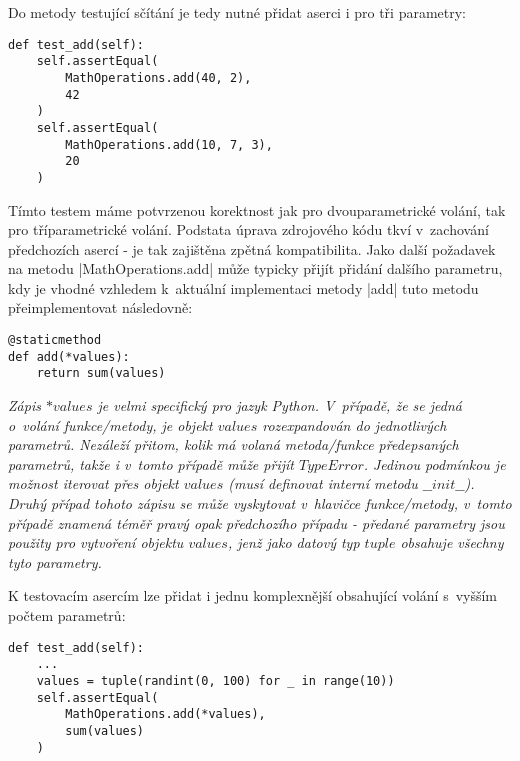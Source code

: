 Do metody testující sčítání je tedy nutné přidat aserci i pro tři parametry:

\begin{lstlisting}[caption={Testovací metoda pro vylepšenou $MathOperations.add$}]
def test_add(self):
	self.assertEqual(
		MathOperations.add(40, 2),
		42
	)
	self.assertEqual(
		MathOperations.add(10, 7, 3),
		20
	)
\end{lstlisting}

\begin{sloppypar}
	Tímto testem máme potvrzenou korektnost jak pro dvouparametrické volání, tak pro  tříparametrické volání. Podstata úprava zdrojového kódu tkví v~zachování předchozích asercí - je tak zajištěna zpětná kompatibilita. Jako další požadavek na metodu \ic|MathOperations.add| může typicky přijít přidání dalšího parametru, kdy je vhodné vzhledem k~aktuální implementaci metody \ic|add| tuto metodu přeimplementovat následovně:
\end{sloppypar}

\begin{lstlisting}[caption={Finální implementace metody $MathOperations.add$}]
@staticmethod
def add(*values):
	return sum(values)
\end{lstlisting}

\textit{
  Zápis $*values$ je velmi specifický pro jazyk Python. V~případě, že se jedná o~volání funkce/metody, je objekt $values$ rozexpandován do jednotlivých parametrů. Nezáleží přitom, kolik má volaná metoda/funkce předepsaných parametrů, takže i v~tomto případě může přijít $TypeError$. Jedinou podmínkou je možnost iterovat přes objekt $values$ (musí definovat interní metodu $\_\_init\_\_$). \\Druhý případ tohoto zápisu se může vyskytovat v~hlavičce funkce/metody, v~tomto případě znamená téměř pravý opak předchozího případu - předané parametry jsou použity pro vytvoření objektu $values$, jenž jako datový typ $tuple$ obsahuje všechny tyto parametry. 
}

K testovacím asercím lze přidat i jednu komplexnější obsahující volání s~vyšším počtem parametrů:

\begin{lstlisting}[caption={Finální test pro metodu $MathOperations.add$}]
def test_add(self):
	...
	values = tuple(randint(0, 100) for _ in range(10))
	self.assertEqual(
		MathOperations.add(*values),
		sum(values)
	)

\end{lstlisting}

